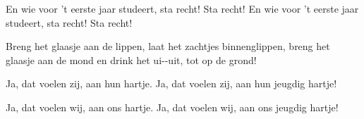 \begin{verse*}
En wie voor 't eerste jaar studeert, sta recht! Sta recht!
En wie voor 't eerste jaar studeert, sta recht! Sta recht!
\end{verse*}

\begin{verse*}
Breng het glaasje aan de lippen,
laat het zachtjes binnenglippen,
breng het glaasje aan de mond
en drink het ui--uit,
tot op de grond!
\end{verse*}

\begin{verse*}
Ja, dat voelen zij, 
aan hun hartje. 
Ja, dat voelen zij, 
aan hun jeugdig hartje!
\end{verse*}

\begin{verse*}
Ja, dat voelen wij, 
aan ons hartje. 
Ja, dat voelen wij, 
aan ons jeugdig hartje!
\end{verse*}

\begin{verse*}
\end{verse*}
